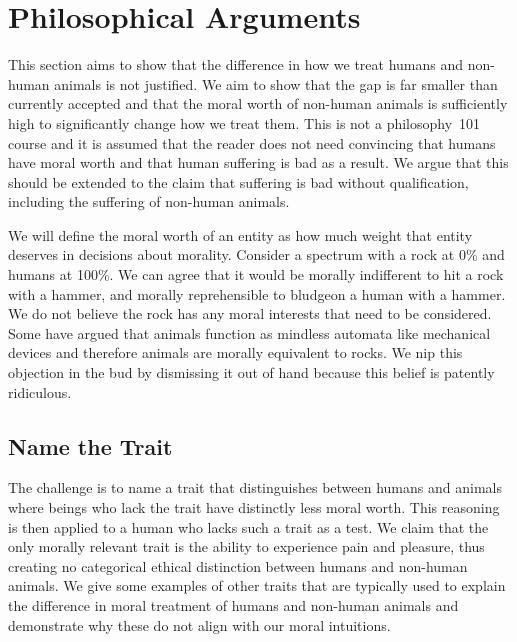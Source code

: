 


\section{Philosophical Arguments}
\label{sec:PhilosophicalArguments}

This section aims to show that the difference in how we treat humans and non-human animals is not justified. We aim to show that the gap is far smaller than currently accepted and that the moral worth of non-human animals is sufficiently high to significantly change how we treat them. This is not a philosophy~101 course and it is assumed that the reader does not need convincing that humans have moral worth and that human suffering is bad as a result. We argue that this should be extended to the claim that suffering is bad without qualification, including the suffering of non-human animals.

We will define the moral worth of an entity as how much weight that entity deserves in decisions about morality. Consider a spectrum with a rock at 0\% and humans at 100\%. We can agree that it would be morally indifferent to hit a rock with a hammer, and morally reprehensible to bludgeon a human with a hammer. We do not believe the rock has any moral interests that need to be considered. Some have argued that animals function as mindless automata like mechanical devices and therefore animals are morally equivalent to rocks. We nip this objection in the bud by dismissing it out of hand because this belief is patently ridiculous.

\subsection{Name the Trait}

The challenge is to name a trait that distinguishes between humans and animals where beings who lack the trait have distinctly less moral worth. This reasoning is then applied to a human who lacks such a trait as a test. We claim that the only morally relevant trait is the ability to experience pain and pleasure, thus creating no categorical ethical distinction between humans and non-human animals. We give some examples of other traits that are typically used to explain the difference in moral treatment of humans and non-human animals and demonstrate why these do not align with our moral intuitions.

